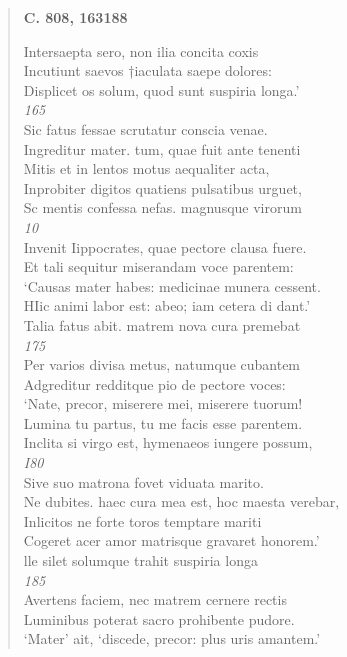 \documentclass[11pt, a4paper]{report}
\begin{document}
\begin{verse}
     \marginpar{[292]} \begin{center} \textbf{C. 808, 163188} \end{center}Intersaepta sero, non ilia concita coxis \\ Incutiunt saevos †iaculata saepe dolores: \\ Displicet os solum, quod sunt suspiria longa.’ \\ \textit{165} \\ Sic fatus fessae scrutatur conscia venae. \\ Ingreditur mater. tum, quae fuit ante tenenti \\ Mitis et in lentos motus aequaliter acta, \\ Inprobiter digitos quatiens pulsatibus urguet, \\ Sc mentis confessa nefas. magnusque virorum \\ \textit{10} \\ Invenit Iippocrates, quae pectore clausa fuere. \\ Et tali sequitur miserandam voce parentem: \\ ‘Causas mater habes: medicinae munera cessent. \\ HIic animi labor est: abeo; iam cetera di dant.’ \\ Talia fatus abit. matrem nova cura premebat \\ \textit{175} \\ Per varios divisa metus, natumque cubantem \\ Adgreditur redditque pio de pectore voces: \\ ‘Nate, precor, miserere mei, miserere tuorum! \\ Lumina tu partus, tu me facis esse parentem. \\ Inclita si virgo est, hymenaeos iungere possum, \\ \textit{I80} \\ Sive suo matrona fovet viduata marito. \\ Ne dubites.  \lbrack haec \rbrack  cura mea est, hoc maesta verebar, \\ Inlicitos ne forte toros temptare mariti \\ Cogeret acer amor matrisque gravaret honorem.’ \\ lle silet solumque trahit suspiria longa \\ \textit{185} \\ Avertens faciem, nec matrem cernere rectis \\ Luminibus poterat sacro prohibente pudore. \\ ‘Mater’ ait, ‘discede, precor: plus uris amantem.’ \\ 

\end{verse}
\end{document}
